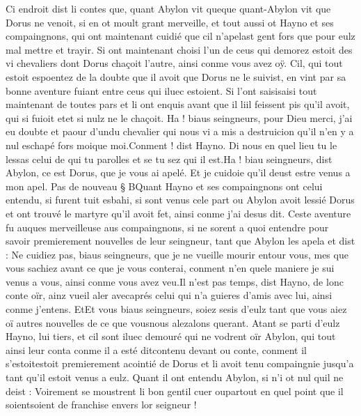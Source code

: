 \documentclass{article}
\begin{document}
\begin{pages}
            
\pstart 
   Ci endroit dist li contes que, quant 
   Abylon vit 
   queque quant-Abylon vit que 
   Dorus ne venoit, si en ot moult grant merveille, 
   et tout aussi ot Hayno et ses compaingnons, qui ont maintenant cuidié que cil n’apelast 
   gent fors que pour eulz mal mettre et trayir. Si ont maintenant choisi l’un de ceus qui demorez estoit des vi chevaliers 
   dont Dorus chaçoit l’autre, 
   ainsi conme vous avez oÿ. Cil, qui tout estoit espoentez de la doubte que il avoit que 
   Dorus ne le suivist, en vint par sa bonne aventure fuiant entre ceus qui iluec estoient. 
   Si l’ont saisisaisi tout maintenant de toutes pars et li ont enquis avant 
   que il liil feissent pis qu’il avoit, qui si fuioit 
   etet si nulz ne le chaçoit.
   Ha ! biaus seingneurs, pour Dieu merci, j’ai eu doubte et paour 
      d’undu 
      chevalier qui nous vi a mis a destruicion qu’il n’en y a nul eschapé fors 
      moique moi.Conment ! dist Hayno. Di nous en quel lieu tu
      le lessas 
      celui de qui tu parolles et se tu sez qui il est.Ha ! biau seingneurs, dist Abylon, 
      ce est Dorus, que je vous ai apelé. Et je cuidoie qu’il deust estre venus a mon apel. \pend
\pstart Pas de nouveau § BQuant Hayno et ses 
   compaingnons ont celui entendu, si furent tuit esbahi, 
   si sont venus cele part ou Abylon avoit lessié Dorus et 
   ont trouvé le martyre qu’il avoit fet, ainsi conme j’ai desus dit. Ceste aventure fu auques merveilleuse 
   aus compaingnons, si ne sorent a quoi entendre pour savoir premierement nouvelles de leur seingneur, 
   tant que Abylon les apela et dist :
   Ne cuidiez pas, biaus seingneurs, que je ne vueille mourir entour vous, 
   mes que vous sachiez avant ce que je vous conterai, conment n’en quele maniere je sui venus a vous, ainsi conme vous avez veu.Il n’est pas temps, dist Hayno, de lonc conte oïr, ainz vueil aler 
      avecaprés 
      celui qui n’a guieres d’amis avec lui, ainsi conme j’entens. 
      EtEt vous biaus seingneurs, soiez sesis d’eulz tant que vous aiez oï 
      autres nouvelles de ce que vousnous 
         alezalons querant. \pend
            \pstart Atant se parti d’eulz Hayno, lui tiers, et cil sont iluec demouré 
   qui ne vodrent oïr Abylon, qui tout ainsi leur 
   conta conme il a esté ditcontenu devant ou conte, 
   conment il s’estoitestoit premierement 
      acointié de Dorus et li avoit tenu compaingnie jusqu’a tant qu’il estoit venus a eulz. 
   Quant il ont entendu Abylon, si n’i ot nul quil ne deist :
   Voirement se moustrent li bon gentil cuer 
      oupartout en quel point que il 
      soientsoient de franchise envers lor seigneur !

\end{pages}
\end{document}
